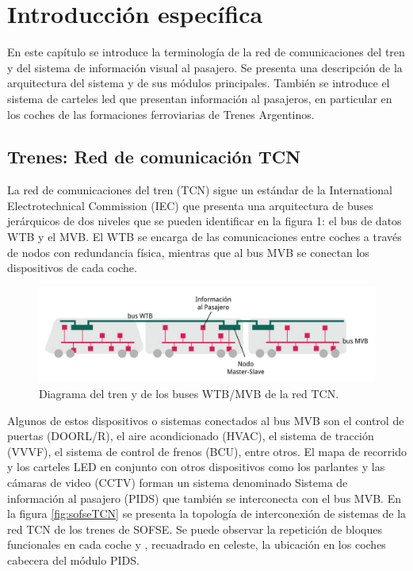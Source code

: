 \chapter{Introducción específica} %

\label{Chapter2}

En este capítulo se introduce la terminología de la red de comunicaciones del tren y del sistema de información visual al pasajero. Se presenta una descripción de la arquitectura del sistema y de sus módulos principales. También se introduce el sistema de carteles led que presentan información al pasajeros, en particular en los coches de las formaciones ferroviarias de Trenes Argentinos.\\

\section{Trenes: Red de comunicación TCN}

La red de comunicaciones del tren (TCN) sigue un estándar de la International Electrotechnical Commission (IEC) que presenta una arquitectura de buses jerárquicos de dos niveles que se pueden identificar en la figura 1: el bus de datos WTB y el MVB\cite{IEC-61375-1999}. El WTB se encarga de las comunicaciones entre coches a través de nodos con redundancia física, mientras que al bus MVB se conectan los dispositivos de cada coche. \\

\begin{figure}[ht]
	\centering
	\includegraphics[width=1\textwidth]{./Figures/diagramaRedTCN.png}
	\caption{Diagrama del tren y de los buses WTB/MVB de la red TCN.}
	\label{fig:redTCN}
\end{figure}

Algunos de estos dispositivos o sistemas conectados al bus MVB son el control de puertas (DOORL/R), el aire acondicionado (HVAC), el sistema de tracción (VVVF), el sistema de control de frenos (BCU), entre otros. El mapa de recorrido y los carteles LED en conjunto con otros dispositivos como los parlantes y las cámaras de video (CCTV) forman un sistema denominado Sistema de información al pasajero (PIDS) que también se interconecta con el bus MVB. En la figura \ref{fig:sofseTCN} se presenta la topología de interconexión de sistemas de la red TCN de los trenes de SOFSE. Se puede observar la repetición de bloques funcionales en cada coche y , recuadrado en celeste, la ubicación en los coches cabecera del módulo PIDS.\\

